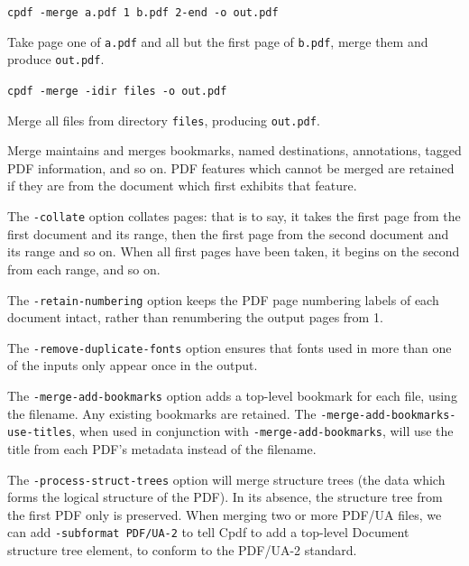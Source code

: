 \documentclass{book}
\begin{document}
  \begin{framed}\small
    \noindent\verb!cpdf -merge a.pdf 1 b.pdf 2-end -o out.pdf!

    \vspace{2.5mm}
    \noindent Take page one of \texttt{a.pdf} and all but the first page of
\texttt{b.pdf}, merge them and produce \texttt{out.pdf}.

    \vspace{1.5mm}
    \noindent\verb!cpdf -merge -idir files -o out.pdf!

    \vspace{2.5mm}
    \noindent Merge all files from directory \texttt{files}, producing \texttt{out.pdf}.

  \end{framed}

\noindent Merge maintains and merges bookmarks, named destinations, annotations, tagged PDF information, and so on. PDF features which cannot be merged are retained if they are from
the document which first exhibits that feature.

The \texttt{-collate} option collates pages: that is to say, it takes the first page from the first document and its range, then the first page from the second document and its range and so on. When all first pages have been taken, it begins on the second from each range, and so on.

The \texttt{-retain-numbering} option keeps the PDF page numbering labels of
each document intact, rather than renumbering the output pages from 1.

The \texttt{-remove-duplicate-fonts} option ensures that fonts used in more than one
of the inputs only appear once in the output.

The \texttt{-merge-add-bookmarks} option adds a top-level bookmark for each file, using the filename. Any existing bookmarks are retained. The \texttt{-merge\--add\--bookmarks\--use\--titles}, when used in conjunction with \texttt{-merge-add-bookmarks}, will use the title from each PDF's metadata instead of the filename.

The \texttt{-process-struct-trees} option will merge structure trees (the data which forms the logical structure of the PDF). In its absence, the structure tree from the first PDF only is preserved. When merging two or more PDF/UA files, we can add \texttt{-subformat PDF/UA-2} to tell Cpdf to add a top-level Document structure tree element, to conform to the PDF/UA-2 standard.
\end{document}
